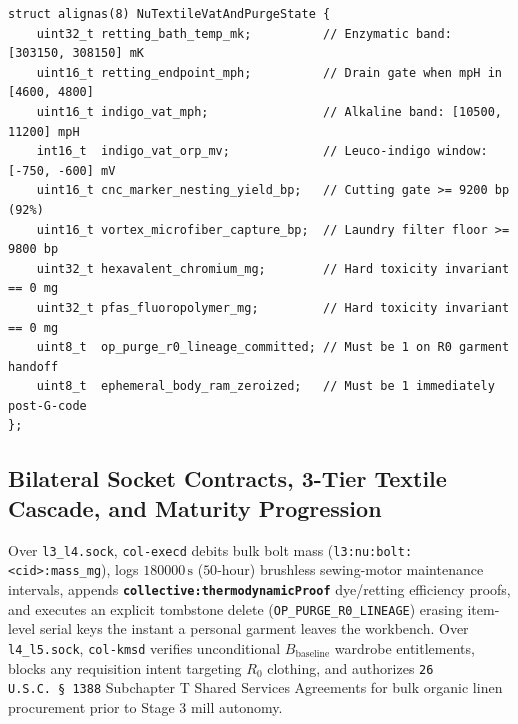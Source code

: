 \begin{lstlisting}[caption={Scenario \texttt{Nu} Bast Retting, Indigo Vat Envelope, and \texttt{OP\_PURGE\_R0\_LINEAGE} Frame},label={lst:nu-structs}]
struct alignas(8) NuTextileVatAndPurgeState {
    uint32_t retting_bath_temp_mk;          // Enzymatic band: [303150, 308150] mK
    uint16_t retting_endpoint_mph;          // Drain gate when mpH in [4600, 4800]
    uint16_t indigo_vat_mph;                // Alkaline band: [10500, 11200] mpH
    int16_t  indigo_vat_orp_mv;             // Leuco-indigo window: [-750, -600] mV
    uint16_t cnc_marker_nesting_yield_bp;   // Cutting gate >= 9200 bp (92%)
    uint16_t vortex_microfiber_capture_bp;  // Laundry filter floor >= 9800 bp
    uint32_t hexavalent_chromium_mg;        // Hard toxicity invariant == 0 mg
    uint32_t pfas_fluoropolymer_mg;         // Hard toxicity invariant == 0 mg
    uint8_t  op_purge_r0_lineage_committed; // Must be 1 on R0 garment handoff
    uint8_t  ephemeral_body_ram_zeroized;   // Must be 1 immediately post-G-code
};
\end{lstlisting}

\subsection{Bilateral Socket Contracts, 3-Tier Textile Cascade, and Maturity Progression}

Over \texttt{l3\_l4.sock}, \texttt{col-execd} debits bulk bolt mass (\texttt{l3:nu:bolt:<cid>:mass\_mg}), logs $180000\,\mathrm{s}$
($50\text{-hour}$) brushless sewing-motor maintenance intervals, appends \textbf{\texttt{collective:thermodynamicProof}} dye/retting efficiency proofs,
and executes an explicit tombstone delete (\texttt{OP\_PURGE\_R0\_LINEAGE}) erasing item-level serial keys the instant a personal garment leaves the
workbench. Over \texttt{l4\_l5.sock}, \texttt{col-kmsd} verifies unconditional $B_{\mathrm{baseline}}$ wardrobe entitlements, blocks any requisition
intent targeting $R_0$ clothing, and authorizes \texttt{26 U.S.C.\ \S~1388} Subchapter T Shared Services Agreements for bulk organic linen procurement
prior to Stage 3 mill autonomy.

